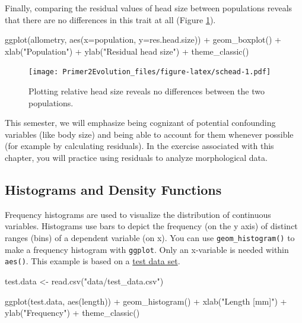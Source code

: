 \documentclass[
]{book}
\newenvironment{Shaded}{\begin{snugshade}}{\end{snugshade}}
\newcommand{\AttributeTok}[1]{\textcolor[rgb]{0.77,0.63,0.00}{#1}}
\newcommand{\FunctionTok}[1]{\textcolor[rgb]{0.00,0.00,0.00}{#1}}
\newcommand{\NormalTok}[1]{#1}
\newcommand{\OtherTok}[1]{\textcolor[rgb]{0.56,0.35,0.01}{#1}}
\newcommand{\SpecialCharTok}[1]{\textcolor[rgb]{0.00,0.00,0.00}{#1}}
\newcommand{\StringTok}[1]{\textcolor[rgb]{0.31,0.60,0.02}{#1}}
\begin{document}
Finally, comparing the residual values of head size between populations reveals that there are no differences in this trait at all (Figure \ref{fig:schead}).

\begin{Shaded}
\begin{Highlighting}[]
\FunctionTok{ggplot}\NormalTok{(allometry, }\FunctionTok{aes}\NormalTok{(}\AttributeTok{x=}\NormalTok{population, }\AttributeTok{y=}\NormalTok{res.head.size)) }\SpecialCharTok{+}
    \FunctionTok{geom\_boxplot}\NormalTok{() }\SpecialCharTok{+}
    \FunctionTok{xlab}\NormalTok{(}\StringTok{"Population"}\NormalTok{) }\SpecialCharTok{+}
    \FunctionTok{ylab}\NormalTok{(}\StringTok{"Residual head size"}\NormalTok{) }\SpecialCharTok{+}
    \FunctionTok{theme\_classic}\NormalTok{()}
\end{Highlighting}
\end{Shaded}

\begin{figure}
\centering
\texttt{[image: Primer2Evolution\_files/figure-latex/schead-1.pdf]}
\caption{\label{fig:schead}Plotting relative head size reveals no differences between the two populations.}
\end{figure}

This semester, we will emphasize being cognizant of potential confounding variables (like body size) and being able to account for them whenever possible (for example by calculating residuals). In the exercise associated with this chapter, you will practice using residuals to analyze morphological data.

\hypertarget{histograms-and-density-functions}{%
\subsection{Histograms and Density Functions}\label{histograms-and-density-functions}}

Frequency histograms are used to visualize the distribution of continuous variables. Histograms use bars to depict the frequency (on the y axis) of distinct ranges (bins) of a dependent variable (on x). You can use \texttt{geom\_histogram()} to make a frequency histogram with \texttt{ggplot}. Only an x-variable is needed within \texttt{aes()}. This example is based on a \href{data/test_data.csv}{test data set}.

\begin{Shaded}
\begin{Highlighting}[]
\NormalTok{test.data }\OtherTok{\textless{}{-}} \FunctionTok{read.csv}\NormalTok{(}\StringTok{"data/test\_data.csv"}\NormalTok{)}

\FunctionTok{ggplot}\NormalTok{(test.data, }\FunctionTok{aes}\NormalTok{(length)) }\SpecialCharTok{+}
    \FunctionTok{geom\_histogram}\NormalTok{() }\SpecialCharTok{+}
    \FunctionTok{xlab}\NormalTok{(}\StringTok{"Length [mm]"}\NormalTok{) }\SpecialCharTok{+}
    \FunctionTok{ylab}\NormalTok{(}\StringTok{"Frequency"}\NormalTok{) }\SpecialCharTok{+}
    \FunctionTok{theme\_classic}\NormalTok{()}
\end{Highlighting}
\end{Shaded}
\end{document}
